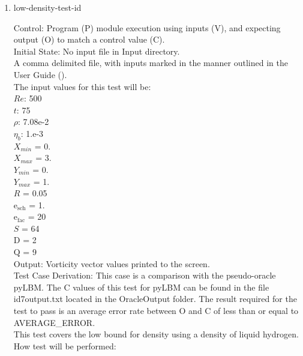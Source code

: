 \documentclass[12pt, titlepage]{article}
\newcounter{testcounter} %
\begin{document}
\begin{enumerate}
\item{low-density-test-id\thetestcounter \\}

Control: Program (P) module execution using inputs (V), and expecting output (O)
to match a control value (C).\\
					
Initial State: No input file in Input directory.\\
					
A comma delimited file, with inputs marked in the manner outlined in the User
Guide (\citet{LBM_UserGuide_PM}).\\The input values for this test will be:\\
$Re$: 500\\
$t$: 75\\
$\rho$: 7.08e-2\\
$\eta_b$: 1.e-3\\
$X_{min}$ = 0.\\
$X_{max}$ = 3.\\
$Y_{min}$ = 0.\\
$Y_{max}$ = 1.\\
$R$ = 0.05\\
$\mathrm{e_{sch}}$ = 1.\\
$\mathrm{e_{fac}}$ = 20\\
$S$ = 64\\
$\mathrm{D}$ = 2\\
$\mathrm{Q}$ = 9\\

Output: Vorticity vector values printed to the screen. \\

Test Case Derivation: This case is a comparison with the pseudo-oracle
pyLBM. The C values of this test for pyLBM can be found in the file
id7output.txt located in the OracleOutput folder. The result required for the
test to pass is an average error rate between O and C of less than or equal to
AVERAGE\_ERROR.\\

This test covers the low bound for density using a density of liquid hydrogen.\\
					
How test will be performed: 


\end{enumerate}
\end{document}

